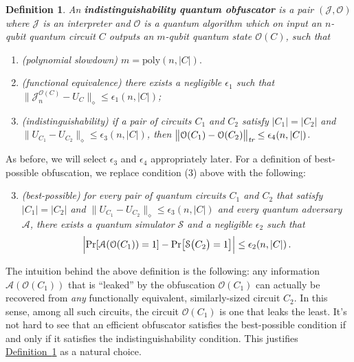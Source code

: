 \documentclass[11pt]{article}
\numberwithin{equation}{section}
\newtheorem{definition}{Definition}
\newcommand{\expref}[2]{\texorpdfstring{\hyperref[#2]{#1~\ref{#2}}}{#1~\ref{#2}}}
\begin{document}
{\begin{definition}\label{def:indistinguishability}
An \textbf{indistinguishability quantum obfuscator} is a pair $(\mathcal J, \mathcal O)$ where $\mathcal J$ is an interpreter and $\mathcal O$ is a quantum algorithm which on input an $n$-qubit quantum circuit $C$ outputs an $m$-qubit quantum state $\mathcal O(C)$, such that
\begin{enumerate}
\item (polynomial slowdown) $m = \text{poly}(n, |C|).$
\item (functional equivalence) there exists a negligible $\epsilon_1$ such that $\bigl\| \mathcal J_n^{\mathcal O(C)} - U_C \bigr\|_\diamond \leq \epsilon_1(n, |C|)$;
\item (indistinguishability) if a pair of circuits $C_1$ and $C_2$ satisfy $|C_1| = |C_2|$ and $\bigl\|U_{C_1} - U_{C_2}\bigr\|_\diamond \leq \epsilon_3(n, |C|)$, then $\bigl\|\mathcal O(C_1) - \mathcal O(C_2)\bigr\|_\emph{tr} \leq \epsilon_4(n, |C|)$.
\end{enumerate}
\end{definition}
\noindent As before, we will select $\epsilon_3$ and $\epsilon_4$ appropriately later. For a definition of best-possible obfuscation, we replace condition (3) above with the following:

\begin{enumerate}
\setcounter{enumi}{2}
\item \emph{(best-possible) for every pair of quantum circuits $C_1$ and $C_2$ that satisfy $|C_1| = |C_2|$ and $\bigl\|U_{C_1} - U_{C_2}\bigr\|_\diamond \leq \epsilon_3(n, |C|)$ and every quantum adversary $\mathcal A$, there exists a quantum simulator $\mathcal S$ and a negligible $\epsilon_2$ such that}
$$
\Bigl| \text{Pr}[\mathcal A(\mathcal O(C_1)) = 1] - \text{Pr}\bigl[\mathcal S\bigl(C_2\bigr) = 1\bigr] \Bigr| \leq \epsilon_2(n, |C|)\,.
$$
\end{enumerate}

The intuition behind the above definition is the following: any information $\mathcal A(\mathcal O(C_1))$ that is ``leaked'' by the obfuscation $\mathcal O(C_1)$ can actually be recovered from \emph{any} functionally equivalent, similarly-sized circuit $C_2$. In this sense, among all such circuits, the circuit $\mathcal O(C_1)$ is one that leaks the least. It's not hard to see that an efficient obfuscator satisfies the best-possible condition if and only if it satisfies the indistinguishability condition. This justifies \expref{Definition}{def:indistinguishability} as a natural choice.

}
\end{document}
